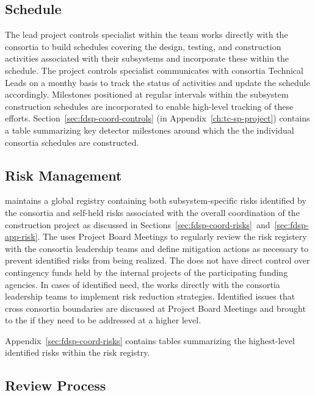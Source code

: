 \subsection{Schedule}

The lead project controls specialist within the  team works
directly with the  consortia to build schedules covering
the design, testing, and construction activities associated with their
subsystems and incorporate these within the 
schedule.  The project controls specialist communicates with consortia
Technical Leads on a monthy basis to track the status of activities
and update the  schedule accordingly.  Milestones
positioned at regular intervals within the subsystem construction
schedules are incorporated to enable high-level tracking of these
efforts.  Section~\ref{sec:fdsp-coord-controls} (in
Appendix~\ref{ch:tc-sp-project}) contains a table summarizing key
detector milestones around which the the individual consortia
schedules are constructed.

\subsection{Risk Management}

  maintains a global registry containing both
subsystem-specific risks identified by the consortia and self-held
risks associated with the overall coordination of the 
construction project as discussed in
Sections~\ref{sec:fdsp-coord-risks}~and~\ref{sec:fdsp-app-risk}.  The
 uses Project Board Meetings to regularly review the
risk registery with the consortia leadership teams and define
mitigation actions as necessary to prevent identified risks from being
realized.  The  does not have direct control over
contingency funds held by the internal projects of the participating
funding agencies.  In cases of identified need, the 
works directly with the consortia leadership teams to implement risk
reduction strategies.  Identified issues that cross consortia
boundaries are discussed at Project Board Meetings and brought to the
  if they need to be addressed at a higher
level.

Appendix~\ref{sec:fdsp-coord-risks} contains tables summarizing the 
highest-level identified risks within the  risk registry.

\subsection{Review Process}

